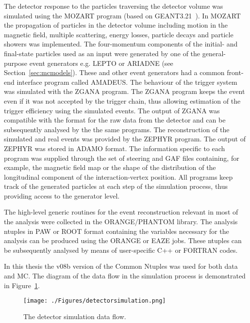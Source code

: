 The detector response to the particles traversing the detector volume was simulated using the MOZART program (based on GEANT3.21~\cite{tech:cern-dd-ee-84-1}). In MOZART the propagation of particles in the detector volume including motion in the magnetic field, multiple scattering, energy losses, particle decays and particle showers was implemented. The four-momentum components of the initial- and final-state particles used as an input were generated by one of the general-purpose event generators e.g. LEPTO or ARIADNE (see Section~\ref{sec:mcmodels}). These and other event generators had a common front-end interface program called AMADEUS. The behaviour of the trigger system was simulated with the ZGANA program. The ZGANA program keeps the event even if it was not accepted by the trigger chain, thus allowing estimation of the trigger efficiency using the simulated events. The output of ZGANA was compatible with the format for the raw data from the detector and can be subsequently analysed by the the same programs. The reconstruction of the simulated and real events was provided by the ZEPHYR program. The output of ZEPHYR was stored in ADAMO format. The information specific to each program was supplied through the set of steering and GAF files containing, for example, the magnetic field map or the shape of the distribution of the longitudinal component of the interaction-vertex position. All programs keep track of the generated particles at each step of the simulation process, thus providing access to the generator level.

The high-level generic routines for the event reconstruction relevant in most of the analysis were collected in the ORANGE/PHANTOM library. The analysis ntuples in PAW or ROOT format containing the variables necessary for the analysis can be produced using the ORANGE or EAZE jobs. These ntuples can be subsequently analysed by means of user-specific C++ or FORTRAN codes. 

In this thesis the v08b version of the Common Ntuples was used for both data and MC. The diagram of the data flow in the simulation process is demonstrated in Figure~\ref{fig:detectorsimulation}.

\begin{figure}[p]
	\centering
		\texttt{[image: ./Figures/detectorsimulation.png]}
	\caption{The \zeus detector simulation data flow.}
	\label{fig:detectorsimulation}
\end{figure}

